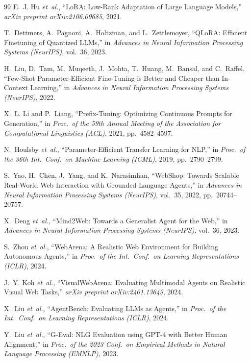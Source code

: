 \documentclass[12pt,a4paper]{report}
\begin{document}
\begin{thebibliography}{99}
E.~J. Hu \textit{et~al.}, ``LoRA: Low-Rank Adaptation of Large Language Models,'' \textit{arXiv preprint arXiv:2106.09685}, 2021.

T.~Dettmers, A.~Pagnoni, A.~Holtzman, and L.~Zettlemoyer, ``QLoRA: Efficient Finetuning of Quantized LLMs,'' in \textit{Advances in Neural Information Processing Systems (NeurIPS)}, vol.~36, 2023.

H.~Liu, D.~Tam, M.~Muqeeth, J.~Mohta, T.~Huang, M.~Bansal, and C.~Raffel, ``Few-Shot Parameter-Efficient Fine-Tuning is Better and Cheaper than In-Context Learning,'' in \textit{Advances in Neural Information Processing Systems (NeurIPS)}, 2022.

X.~L. Li and P.~Liang, ``Prefix-Tuning: Optimizing Continuous Prompts for Generation,'' in \textit{Proc.\ of the 59th Annual Meeting of the Association for Computational Linguistics (ACL)}, 2021, pp.~4582--4597.

N.~Houlsby \textit{et~al.}, ``Parameter-Efficient Transfer Learning for NLP,'' in \textit{Proc.\ of the 36th Int.\ Conf.\ on Machine Learning (ICML)}, 2019, pp.~2790--2799.

S.~Yao, H.~Chen, J.~Yang, and K.~Narasimhan, ``WebShop: Towards Scalable Real-World Web Interaction with Grounded Language Agents,'' in \textit{Advances in Neural Information Processing Systems (NeurIPS)}, vol.~35, 2022, pp.~20744--20757.

X.~Deng \textit{et~al.}, ``Mind2Web: Towards a Generalist Agent for the Web,'' in \textit{Advances in Neural Information Processing Systems (NeurIPS)}, vol.~36, 2023.

S.~Zhou \textit{et~al.}, ``WebArena: A Realistic Web Environment for Building Autonomous Agents,'' in \textit{Proc.\ of the Int.\ Conf.\ on Learning Representations (ICLR)}, 2024.

J.~Y. Koh \textit{et~al.}, ``VisualWebArena: Evaluating Multimodal Agents on Realistic Visual Web Tasks,'' \textit{arXiv preprint arXiv:2401.13649}, 2024.

X.~Liu \textit{et~al.}, ``AgentBench: Evaluating LLMs as Agents,'' in \textit{Proc.\ of the Int.\ Conf.\ on Learning Representations (ICLR)}, 2024.

Y.~Liu \textit{et~al.}, ``G-Eval: NLG Evaluation using GPT-4 with Better Human Alignment,'' in \textit{Proc.\ of the 2023 Conf.\ on Empirical Methods in Natural Language Processing (EMNLP)}, 2023.


\end{thebibliography}
\end{document}
